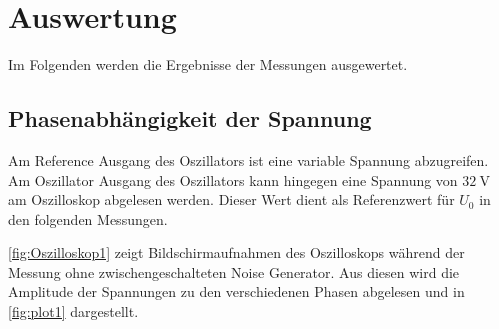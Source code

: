 \section{Auswertung}
\label{sec:Auswertung}
Im Folgenden werden die Ergebnisse der Messungen ausgewertet.

\subsection{Phasenabhängigkeit der Spannung} %
\label{sub:Phasenabhängigkeit der Spannung}


Am Reference Ausgang des Oszillators ist eine variable Spannung abzugreifen. Am Oszillator Ausgang des Oszillators kann hingegen eine Spannung von $\qty{32}{\volt}$
am Oszilloskop abgelesen werden.
Dieser Wert dient als Referenzwert für $U_{0}$ in den folgenden Messungen.

\autoref{fig:Oszilloskop1} zeigt Bildschirmaufnahmen des Oszilloskops während der Messung ohne zwischengeschalteten Noise Generator. Aus diesen wird die 
Amplitude der Spannungen zu den verschiedenen Phasen abgelesen und in \autoref{fig:plot1} dargestellt.

